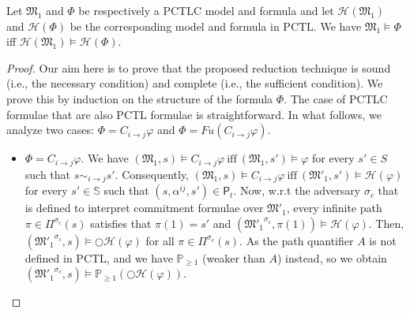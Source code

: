 %
%

\begin{theorem}\label{soundness-PCTL}
Let $\mathfrak{M_1}$ and $\Phi$ be respectively a PCTLC model
and formula and let $\mathscr{H}(\mathfrak{M_1})$  and
$\mathscr{H}(\Phi)$ be the corresponding model and formula in
PCTL. We have $\mathfrak{M_1}\models\Phi$ iff
$\mathscr{H}(\mathfrak{M_1}) \models \mathscr{H}(\Phi)$.
\end{theorem}

\begin{proof} %
Our aim here is to prove that the proposed reduction technique is
sound (i.e., the necessary condition) and complete (i.e., the sufficient condition). We prove this by induction on the structure of the formula $\Phi$. The case of PCTLC formulae that are also PCTL formulae is
straightforward. In what follows, we analyze two cases: $\Phi =
C_{i \rightarrow j} \varphi$ and $\Phi = Fu(C_{i \rightarrow j}
\varphi)$.

\begin{itemize}
\item $\Phi = C_{i \rightarrow j} \varphi$. We have
$(\mathfrak{M_1},s)\models C_{i\rightarrow j}\varphi ~\text{iff}~
(\mathfrak{M_1},s') \models \varphi$ for every $s' \in S$
such that $s\sim_{i \rightarrow j}s'$. Consequently,
$(\mathfrak{M_1},s)\models C_{i\rightarrow j}\varphi ~\text{iff}~
(\mathfrak{M'_1},s') \models \mathscr{H}(\varphi)$ for every
$s' \in \mathbb{S}$ such that $(s,\alpha^{ij},s') \in
\textsf{P}_t$. Now, w.r.t the adversary $\sigma_c$ that is defined
to interpret commitment formulae over $\mathfrak{M'_1}$,
every infinite path $\pi \in \Pi^{\sigma_c}(s)$ satisfies that
$\pi(1)=s'$ and $(\mathfrak{M'_1}^{\sigma_c},\pi(1))\models
\mathscr{H}(\varphi)$. Then,
$(\mathfrak{M'_1}^{\sigma_c},s)\models
\bigcirc\mathscr{H}(\varphi)$ for all $\pi \in \Pi^{\sigma_c}(s)$.
As the path quantifier $A$ is not defined in PCTL, and we have
$\mathbb{P}_{\geq1}$ (weaker than $A$) instead, so we obtain
$(\mathfrak{M'_1}^{\sigma_c},s)\models
\mathbb{P}_{\geq1}(\bigcirc\mathscr{H}(\varphi))$.


\end{itemize}
\end{proof}
